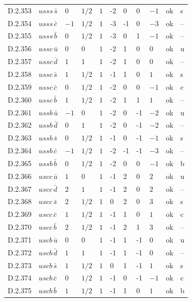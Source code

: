 {\begin{longtable}{@{}llllllllll>{\raggedright\arraybackslash}p{2.0cm}@{}}
D.2.353 & $usss\,\bar{s}$ & $0$ & $1/2$ & $1$ & -2 & 0 & 0 & $-1$ & ok & s \\
D.2.354 & $usss\,\bar{c}$ & $-1$ & $1/2$ & $1$ & -3 & -1 & 0 & $-3$ & ok & -- \\
D.2.355 & $usss\,\bar{b}$ & $0$ & $1/2$ & $1$ & -3 & 0 & 1 & $-1$ & ok & -- \\
D.2.356 & $ussc\,\bar{u}$ & $0$ & $0$ & $1$ & -2 & 1 & 0 & $0$ & ok & u \\
D.2.357 & $ussc\,\bar{d}$ & $1$ & $1$ & $1$ & -2 & 1 & 0 & $0$ & ok & -- \\
D.2.358 & $ussc\,\bar{s}$ & $1$ & $1/2$ & $1$ & -1 & 1 & 0 & $1$ & ok & s \\
D.2.359 & $ussc\,\bar{c}$ & $0$ & $1/2$ & $1$ & -2 & 0 & 0 & $-1$ & ok & c \\
D.2.360 & $ussc\,\bar{b}$ & $1$ & $1/2$ & $1$ & -2 & 1 & 1 & $1$ & ok & -- \\
D.2.361 & $ussb\,\bar{u}$ & $-1$ & $0$ & $1$ & -2 & 0 & -1 & $-2$ & ok & u \\
D.2.362 & $ussb\,\bar{d}$ & $0$ & $1$ & $1$ & -2 & 0 & -1 & $-2$ & ok & -- \\
D.2.363 & $ussb\,\bar{s}$ & $0$ & $1/2$ & $1$ & -1 & 0 & -1 & $-1$ & ok & s \\
D.2.364 & $ussb\,\bar{c}$ & $-1$ & $1/2$ & $1$ & -2 & -1 & -1 & $-3$ & ok & -- \\
D.2.365 & $ussb\,\bar{b}$ & $0$ & $1/2$ & $1$ & -2 & 0 & 0 & $-1$ & ok & b \\
D.2.366 & $uscc\,\bar{u}$ & $1$ & $0$ & $1$ & -1 & 2 & 0 & $2$ & ok & u \\
D.2.367 & $uscc\,\bar{d}$ & $2$ & $1$ & $1$ & -1 & 2 & 0 & $2$ & ok & -- \\
D.2.368 & $uscc\,\bar{s}$ & $2$ & $1/2$ & $1$ & 0 & 2 & 0 & $3$ & ok & s \\
D.2.369 & $uscc\,\bar{c}$ & $1$ & $1/2$ & $1$ & -1 & 1 & 0 & $1$ & ok & c \\
D.2.370 & $uscc\,\bar{b}$ & $2$ & $1/2$ & $1$ & -1 & 2 & 1 & $3$ & ok & -- \\
D.2.371 & $uscb\,\bar{u}$ & $0$ & $0$ & $1$ & -1 & 1 & -1 & $0$ & ok & u \\
D.2.372 & $uscb\,\bar{d}$ & $1$ & $1$ & $1$ & -1 & 1 & -1 & $0$ & ok & -- \\
D.2.373 & $uscb\,\bar{s}$ & $1$ & $1/2$ & $1$ & 0 & 1 & -1 & $1$ & ok & s \\
D.2.374 & $uscb\,\bar{c}$ & $0$ & $1/2$ & $1$ & -1 & 0 & -1 & $-1$ & ok & c \\
D.2.375 & $uscb\,\bar{b}$ & $1$ & $1/2$ & $1$ & -1 & 1 & 0 & $1$ & ok & b \\

\end{longtable}}
